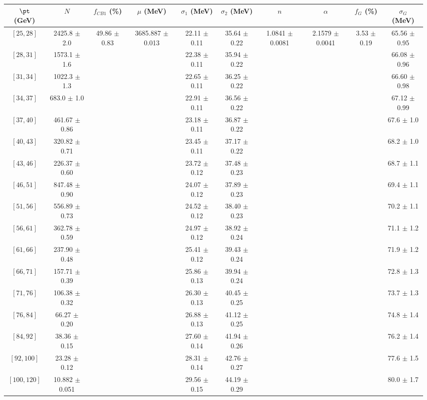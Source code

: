 \begin{tabular}{c||c|c|c|c|c|c|c|c|c}
$\pt$ (GeV) & $N$ & $f_{CB1}$ (\%)  & $\mu$ (MeV) & $\sigma_1$ (MeV) & $\sigma_2$ (MeV) & $n$ & $\alpha$ & $f_G$ (\%) & $\sigma_G$ (MeV) \\
\hline
$[25, 28]$ & 2425.8 $\pm$ 2.0 & \multirow{17}{*}{49.86 $\pm$ 0.83} & \multirow{17}{*}{3685.887 $\pm$ 0.013} & 22.11 $\pm$ 0.11 & 35.64 $\pm$ 0.22 & \multirow{17}{*}{1.0841 $\pm$ 0.0081} & \multirow{17}{*}{2.1579 $\pm$ 0.0041} & \multirow{17}{*}{3.53 $\pm$ 0.19} & 65.56 $\pm$ 0.95\\
$[28, 31]$ & 1573.1 $\pm$ 1.6 &  &  & 22.38 $\pm$ 0.11 & 35.94 $\pm$ 0.22 &  &  &  & 66.08 $\pm$ 0.96\\
$[31, 34]$ & 1022.3 $\pm$ 1.3 &  &  & 22.65 $\pm$ 0.11 & 36.25 $\pm$ 0.22 &  &  &  & 66.60 $\pm$ 0.98\\
$[34, 37]$ & 683.0 $\pm$ 1.0 &  &  & 22.91 $\pm$ 0.11 & 36.56 $\pm$ 0.22 &  &  &  & 67.12 $\pm$ 0.99\\
$[37, 40]$ & 461.67 $\pm$ 0.86 &  &  & 23.18 $\pm$ 0.11 & 36.87 $\pm$ 0.22 &  &  &  & 67.6 $\pm$ 1.0\\
$[40, 43]$ & 320.82 $\pm$ 0.71 &  &  & 23.45 $\pm$ 0.11 & 37.17 $\pm$ 0.22 &  &  &  & 68.2 $\pm$ 1.0\\
$[43, 46]$ & 226.37 $\pm$ 0.60 &  &  & 23.72 $\pm$ 0.12 & 37.48 $\pm$ 0.23 &  &  &  & 68.7 $\pm$ 1.1\\
$[46, 51]$ & 847.48 $\pm$ 0.90 &  &  & 24.07 $\pm$ 0.12 & 37.89 $\pm$ 0.23 &  &  &  & 69.4 $\pm$ 1.1\\
$[51, 56]$ & 556.89 $\pm$ 0.73 &  &  & 24.52 $\pm$ 0.12 & 38.40 $\pm$ 0.23 &  &  &  & 70.2 $\pm$ 1.1\\
$[56, 61]$ & 362.78 $\pm$ 0.59 &  &  & 24.97 $\pm$ 0.12 & 38.92 $\pm$ 0.24 &  &  &  & 71.1 $\pm$ 1.2\\
$[61, 66]$ & 237.90 $\pm$ 0.48 &  &  & 25.41 $\pm$ 0.12 & 39.43 $\pm$ 0.24 &  &  &  & 71.9 $\pm$ 1.2\\
$[66, 71]$ & 157.71 $\pm$ 0.39 &  &  & 25.86 $\pm$ 0.13 & 39.94 $\pm$ 0.24 &  &  &  & 72.8 $\pm$ 1.3\\
$[71, 76]$ & 106.38 $\pm$ 0.32 &  &  & 26.30 $\pm$ 0.13 & 40.45 $\pm$ 0.25 &  &  &  & 73.7 $\pm$ 1.3\\
$[76, 84]$ & 66.27 $\pm$ 0.20 &  &  & 26.88 $\pm$ 0.13 & 41.12 $\pm$ 0.25 &  &  &  & 74.8 $\pm$ 1.4\\
$[84, 92]$ & 38.36 $\pm$ 0.15 &  &  & 27.60 $\pm$ 0.14 & 41.94 $\pm$ 0.26 &  &  &  & 76.2 $\pm$ 1.4\\
$[92, 100]$ & 23.28 $\pm$ 0.12 &  &  & 28.31 $\pm$ 0.14 & 42.76 $\pm$ 0.27 &  &  &  & 77.6 $\pm$ 1.5\\
$[100, 120]$ & 10.882 $\pm$ 0.051 &  &  & 29.56 $\pm$ 0.15 & 44.19 $\pm$ 0.29 &  &  &  & 80.0 $\pm$ 1.7\\
\end{tabular}
